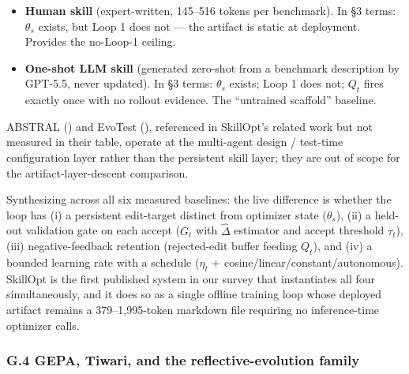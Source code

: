 \documentclass[
]{article}
\begin{document}
\begin{itemize}
  genuine, but there is no \(\eta_t\) bound on per-step folder edits and
  no rejected-edit buffer. SkillOpt beats EvoSkill by \(+14.0\) inside
  Codex and \(+3.2\) inside Claude Code on the GPT-5.5 five-benchmark
  average.
\item
  \textbf{Human skill} (expert-written, 145--516 tokens per benchmark).
  In §3 terms: \(\theta_s\) exists, but Loop 1 does not --- the artifact
  is static at deployment. Provides the no-Loop-1 ceiling.
\item
  \textbf{One-shot LLM skill} (generated zero-shot from a benchmark
  description by GPT-5.5, never updated). In §3 terms: \(\theta_s\)
  exists; Loop 1 does not; \(Q_t\) fires exactly once with no rollout
  evidence. The ``untrained scaffold'' baseline.
\end{itemize}

ABSTRAL () and EvoTest
(), referenced in
SkillOpt's related work but not measured in their table, operate at the
multi-agent design / test-time configuration layer rather than the
persistent skill layer; they are out of scope for the
artifact-layer-descent comparison.

Synthesizing across all six measured baselines: the live difference is
whether the loop has (i) a persistent edit-target distinct from
optimizer state (\(\theta_s\)), (ii) a held-out validation gate on each
accept (\(G_t\) with \(\widehat\Delta\) estimator and accept threshold
\(\tau_t\)), (iii) negative-feedback retention (rejected-edit buffer
feeding \(Q_t\)), and (iv) a bounded learning rate with a schedule
(\(\eta_t\) + cosine/linear/constant/autonomous). SkillOpt is the first
published system in our survey that instantiates all four
simultaneously, and it does so as a single offline training loop whose
deployed artifact remains a 379--1,995-token markdown file requiring no
inference-time optimizer calls.

\subsubsection{G.4 GEPA, Tiwari, and the reflective-evolution
family}\label{g.4-gepa-tiwari-and-the-reflective-evolution-family}
\end{document}
